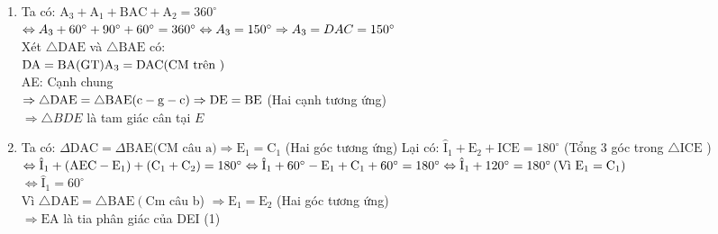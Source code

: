 \begin{bt}
{\begin{enumerate}
                $
                \mathrm{DA} =\mathrm{BA}(\mathrm{GT}) \\
                \mathrm{DAC} =\mathrm{BAE}(\mathrm{CM} \text { trên) } \\
                \mathrm{AC} =\mathrm{AE}(\mathrm{GT}) \\
                \Rightarrow \Delta \mathrm{DAC} =\Delta \mathrm{BAE}(\mathrm{c}-\mathrm{g}-\mathrm{c}) \Rightarrow \mathrm{BE}=\mathrm{CD} \text { (Hai cạnh tương ứng) }
                $
				\item Ta có:  $\mathrm{A}_3+\mathrm{A}_1+\mathrm{BAC}+\mathrm{A}_2=360^{\circ}$\\
				$ \Leftrightarrow A_3+60^{\circ}+90^{\circ}+60^{\circ}=360^{\circ} \\
				 \Leftrightarrow A_3=150^{\circ} \\
				 \Rightarrow A_3=D A C=150^{\circ}$\\
				 Xét $\triangle \mathrm{DAE}$ và $\triangle \mathrm{BAE}$ có:\\
				 $
				 \mathrm{DA}=\mathrm{BA}(\mathrm{GT}) \\
				 \mathrm{A}_3=\mathrm{DAC}(\mathrm{CM} \text { trên })$\\
				 AE: Cạnh chung\\
				 $\Rightarrow \triangle \mathrm{DAE}=\triangle \mathrm{BAE}(\mathrm{c}-\mathrm{g}-\mathrm{c}) \\\Rightarrow \mathrm{DE}=\mathrm{BE}$ (Hai cạnh tương ứng)\\
				 $\Rightarrow \triangle B D E$ là tam giác cân tại $E$
				 \item Ta có: $\Delta \mathrm{DAC}=\Delta \mathrm{BAE}(\mathrm{CM}$ câu $\mathrm{a}) \Rightarrow \mathrm{E}_1=\mathrm{C}_1$ (Hai góc tương ứng)
				 Lại có: $\hat{\mathrm{I}}_1+\mathrm{E}_2+\mathrm{ICE}=180^{\circ}$ (Tổng 3 góc trong $\triangle \mathrm{ICE}$ )\\
				 $
				 \Leftrightarrow \hat{\mathrm{I}}_1+\left(\mathrm{AEC}-\mathrm{E}_1\right)+\left(\mathrm{C}_1+\mathrm{C}_2\right)=180^{\circ} \\
				 \Leftrightarrow \hat{\mathrm{I}}_1+60^{\circ}-\mathrm{E}_1+\mathrm{C}_1+60^{\circ}=180^{\circ} \\
				 \Leftrightarrow \hat{\mathrm{I}}_1+120^{\circ}=180^{\circ}\left(\text{Vì } \mathrm{E}_1=\mathrm{C}_1\right)$\\ 
				 $\Leftrightarrow \hat{\mathrm{I}}_1=60^{\circ}$\\
				 Vì $\triangle \mathrm{DAE}=\triangle \mathrm{BAE}\left(\mathrm{Cm}\right.$ câu b) $\Rightarrow \mathrm{E}_1=\mathrm{E}_2$ (Hai góc tương ứng)\\ $\Rightarrow \mathrm{EA}$ là tia phân giác của DEI (1)\\

\end{enumerate}}
\end{bt}
